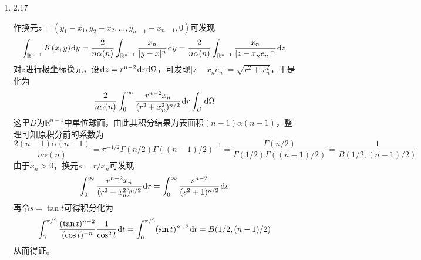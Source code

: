 \documentclass[a4paper,UTF8,fontset=windows,10pt]{ctexart}
\newcommand*{\dr}{\hspace{0.07em}\mathrm{d}}
\begin{document}
\begin{enumerate}
    \item 2.17
    
    作换元$z=(y_1-x_1,y_2-x_2,\dots,y_{n-1}-x_{n-1},0)$可发现
    $$\int_{\mathbb{R}^{n-1}}K(x,y)\dr y=\frac{2}{n\alpha(n)}\int_{\mathbb{R}^{n-1}}\frac{x_n}{|y-x|^n}\dr y=\frac{2}{n\alpha(n)}\int_{\mathbb{R}^{n-1}}\frac{x_n}{|z-x_ne_n|^n}\dr z$$
    对$z$进行极坐标换元，设$\dr z=r^{n-2}\dr r\dr\Omega$，可发现$|z-x_ne_n|=\sqrt{r^2+x_n^2}$，于是化为
    $$\frac{2}{n\alpha(n)}\int_0^\infty\frac{r^{n-2}x_n}{(r^2+x_n^2)^{n/2}}\dr r\int_D\dr\Omega$$
    这里$D$为$\mathbb{R}^{n-1}$中单位球面，由此其积分结果为表面积$(n-1)\alpha(n-1)$，整理可知原积分前的系数为
    $$\frac{2(n-1)\alpha(n-1)}{n\alpha(n)}=\pi^{-1/2}\Gamma(n/2)\Gamma((n-1)/2)^{-1}=\frac{\Gamma(n/2)}{\Gamma(1/2)\Gamma((n-1)/2)}=\frac{1}{B(1/2,(n-1)/2)}$$
    由于$x_n>0$，换元$s=r/x_n$可发现
    $$\int_0^\infty\frac{r^{n-2}x_n}{(r^2+x_n^2)^{n/2}}\dr r=\int_0^\infty\frac{s^{n-2}}{(s^2+1)^{n/2}}\dr s$$
    再令$s=\tan t$可得积分化为
    $$\int_0^{\pi/2}\frac{(\tan t)^{n-2}}{(\cos t)^{-n}}\frac{1}{\cos^2t}\dr t=\int_0^{\pi/2}(\sin t)^{n-2}\dr t=B(1/2,(n-1)/2)$$
    从而得证。
\end{enumerate}
\end{document}
